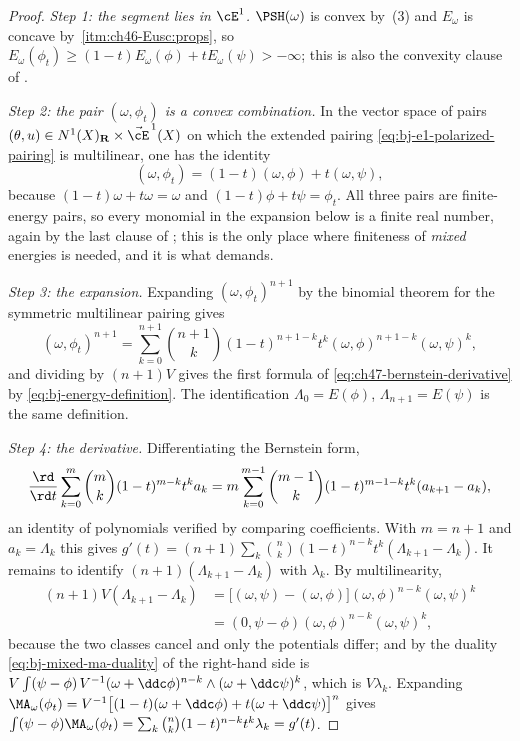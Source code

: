 \begin{proof}
\emph{Step 1: the segment lies in $\cE^1$.}  $\PSH(\omega)$ is convex
by \,(3) and $E_\omega$ is concave by
\,\cref{itm:ch46-Eusc:props}, so
$E_\omega(\phi_t)\ge(1-t)E_\omega(\phi)+tE_\omega(\psi)>-\infty$; this is
also the convexity clause of .

\emph{Step 2: the pair $(\omega,\phi_t)$ is a convex combination.}  In
the vector space of pairs $(\theta,u)\in N^1(X)_{\mathbf R}\times
\vec\cE^{\,1}(X)$ on which the extended pairing
\eqref{eq:bj-e1-polarized-pairing} is multilinear, one has the identity
\[
 (\omega,\phi_t)=(1-t)(\omega,\phi)+t(\omega,\psi),
\]
because $(1-t)\omega+t\omega=\omega$ and
$(1-t)\phi+t\psi=\phi_t$.  All three pairs are finite-energy pairs, so
every monomial in the expansion below is a finite real number, again by the
last clause of ; this is the only place where
finiteness of \emph{mixed} energies is needed, and it is what
 demands.

\emph{Step 3: the expansion.}  Expanding $(\omega,\phi_t)^{n+1}$ by the
binomial theorem for the symmetric multilinear pairing gives
\[
 (\omega,\phi_t)^{n+1}
 =\sum_{k=0}^{n+1}\binom{n+1}{k}(1-t)^{n+1-k}t^k
   (\omega,\phi)^{n+1-k}(\omega,\psi)^k,
\]
and dividing by $(n+1)V$ gives the first formula of
\eqref{eq:ch47-bernstein-derivative} by
\eqref{eq:bj-energy-definition}.  The identification
$\Lambda_0=E(\phi)$, $\Lambda_{n+1}=E(\psi)$ is the same definition.

\emph{Step 4: the derivative.}  Differentiating the Bernstein form,
\[
 \frac{\rd}{\rd t}\sum_{k=0}^{m}\binom{m}{k}(1-t)^{m-k}t^ka_k
 =m\sum_{k=0}^{m-1}\binom{m-1}{k}(1-t)^{m-1-k}t^k(a_{k+1}-a_k),
\]
an identity of polynomials verified by comparing coefficients.  With
$m=n+1$ and $a_k=\Lambda_k$ this gives
$g'(t)=(n+1)\sum_{k}\binom{n}{k}(1-t)^{n-k}t^k(\Lambda_{k+1}-\Lambda_k)$.
It remains to identify $(n+1)(\Lambda_{k+1}-\Lambda_k)$ with
$\lambda_k$.  By multilinearity,
\[
 \begin{aligned}
  (n+1)V(\Lambda_{k+1}-\Lambda_k)
   &=\bigl[(\omega,\psi)-(\omega,\phi)\bigr]
     (\omega,\phi)^{n-k}(\omega,\psi)^k\\
   &=(0,\psi-\phi)(\omega,\phi)^{n-k}(\omega,\psi)^k,
 \end{aligned}
\]
because the two classes cancel and only the potentials differ; and by the
duality \eqref{eq:bj-mixed-ma-duality} of  the
right-hand side is
$V\int(\psi-\phi)\,V^{-1}(\omega+\ddc\phi)^{n-k}\wedge(\omega+\ddc\psi)^k$,
which is $V\lambda_k$.  Expanding
$\MA_\omega(\phi_t)=V^{-1}\bigl[(1-t)(\omega+\ddc\phi)+t(\omega+\ddc\psi)\bigr]^n$
gives $\int(\psi-\phi)\MA_\omega(\phi_t)
=\sum_k\binom nk(1-t)^{n-k}t^k\lambda_k=g'(t)$.


\end{proof}
